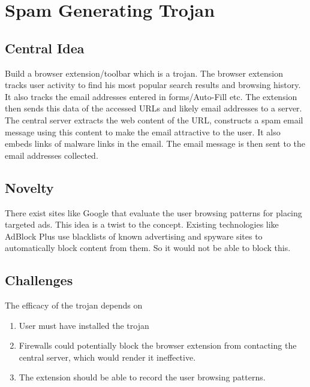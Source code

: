 \documentclass[a4paper]{article}
\begin{document}
\section{Spam Generating Trojan}
\subsection{Central Idea}
Build a browser extension/toolbar which is a trojan. The browser extension tracks user activity to find his most popular search results and browsing history. It also tracks the email addresses entered in forms/Auto-Fill etc. 
The extension then sends this data of the accessed URLs and likely email addresses to a server. The central server extracts the web content of the URL, constructs a spam email message using this content to make the email attractive to the user. It also embeds links of malware links in the email. The email message is then sent to the email addresses collected.

\subsection{Novelty}
There exist sites like Google that evaluate the user browsing patterns for placing targeted ads. This idea is a twist to the concept. Existing technologies like AdBlock Plus use blacklists of known advertising and spyware sites to automatically block content from them. So it would not be able to block this.

\subsection{Challenges}
The efficacy of the trojan depends on
\begin{enumerate}
\item User must have installed the trojan

\item Firewalls could potentially block the browser extension from contacting the central server, which would render it ineffective.

\item The extension should be able to record the user browsing patterns.
\end{enumerate}
\end{document}
